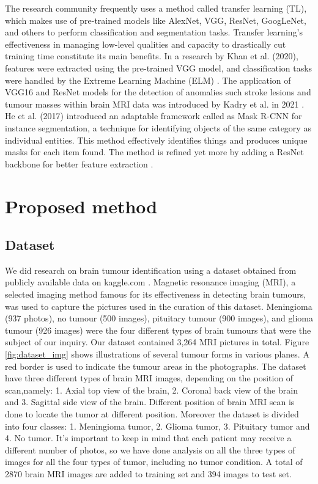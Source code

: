 \documentclass[12pt, a4paper,twoside]{report}
\theoremstyle{plain} %
\theoremstyle{definition} %
\theoremstyle{remark} %
\numberwithin{equation}{chapter}
\begin{document}
The research community frequently uses a method called transfer learning (TL), which makes use of pre-trained models like AlexNet, VGG, ResNet, GoogLeNet, and others to perform classification and segmentation tasks. Transfer learning's effectiveness in managing low-level qualities and capacity to drastically cut training time constitute its main benefits. In a research by Khan et al. (2020), features were extracted using the pre-trained VGG model, and classification tasks were handled by the Extreme Learning Machine (ELM) \cite{khan2020multimodal}. The application of VGG16 and ResNet models for the detection of anomalies such stroke lesions and tumour masses within brain MRI data was introduced by Kadry et al. in 2021 \cite{kadry2021automated}. He et al. (2017) introduced an adaptable framework called as Mask R-CNN for instance segmentation, a technique for identifying objects of the same category as individual entities. This method effectively identifies things and produces unique masks for each item found. The method is refined yet more by adding a ResNet backbone for better feature extraction \cite{he2017mask}.



\chapter{Proposed method}\label{ch:3}

\section{Dataset}\label{sec:3.1}
We did research on brain tumour identification using a dataset obtained from publicly available data on kaggle.com \cite{dataset22}. Magnetic resonance imaging (MRI), a selected imaging method famous for its effectiveness in detecting brain tumours, was used to capture the pictures used in the curation of this dataset. Meningioma (937 photos), no tumour (500 images), pituitary tumour (900 images), and glioma tumour (926 images) were the four different types of brain tumours that were the subject of our inquiry. Our dataset contained 3,264 MRI pictures in total. Figure \ref{fig:dataset_img} shows illustrations of several tumour forms in various planes. A red border is used to indicate the tumour areas in the photographs. The dataset have three different types of brain MRI images, depending on the position of scan,namely: 1. Axial \- top view of the brain, 2. Coronal \- back view of the brain and 3. Sagittal \-side view of the brain. Different position of brain MRI scan is done to locate the tumor at different position. Moreover the dataset is divided into four classes: 1. Meningioma tumor, 2. Glioma tumor, 3. Pituitary tumor and 4. No tumor. It's important to keep in mind that each patient may receive a different number of photos, so we have done analysis on all the three types of images for all the four types of tumor, including no tumor condition. A total of 2870 brain MRI images are added to training set and 394 images to test set.
\end{document}
